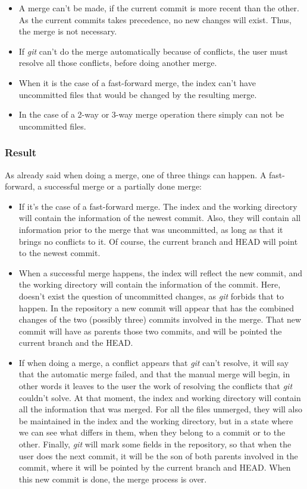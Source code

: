 \begin{itemize}
\item A merge can't be made, if the current commit is more recent than the
other. As the current commits takes precedence, no new changes will exist. 
Thus, the merge is not necessary.
\item If \emph{git} can't do the merge automatically because of conflicts,
the user must resolve all those conflicts, before doing another merge.

\item When it is the case of a fast-forward merge, the index can't have 
uncommitted files that would be changed by the resulting merge.

\item In the case of a 2-way or 3-way merge operation there simply 
can not be uncommitted files.
\end{itemize}

\subsubsection{Result}
As already said when doing a merge, one of three things can happen. A 
fast-forward, a successful merge or a partially done merge:

\begin{itemize}
\item If it's the case of a fast-forward merge. The index and the working directory
will contain the information of the newest commit. Also, they will contain all 
information prior to the merge that was uncommitted, as long as that it brings
no conflicts to it. Of course, the current branch and HEAD will point to the
newest commit.

\item When a successful merge happens, the index will reflect the new commit,
and the working directory will contain the information of the commit. Here,
doesn't exist the question of uncommitted changes, as \emph{git} forbids that
to happen. In the repository a new commit will appear that has the combined
changes of the two (possibly three) commits involved in the merge. That new
commit will have as parents those two commits, and will be pointed the current
branch and the HEAD.

\item If when doing a merge, a conflict appears that \emph{git} can't resolve,
it will say that the automatic merge failed, and that the manual merge will
begin, in other words it leaves to the user the work of resolving the conflicts
that \emph{git} couldn't solve. At that moment, the index and working directory
will contain all the information that was merged. For all the files unmerged, they
will also be maintained in the index and the working directory, but in a
state where we can see what differs in them, when they belong to a commit or to
the other. Finally, \emph{git} will mark some fields in the repository, so that
when the user does the next commit, it will be the son of both parents
involved in the commit, where it will be pointed by the current branch and HEAD.
When this new commit is done, the merge process is over.

\end{itemize}

